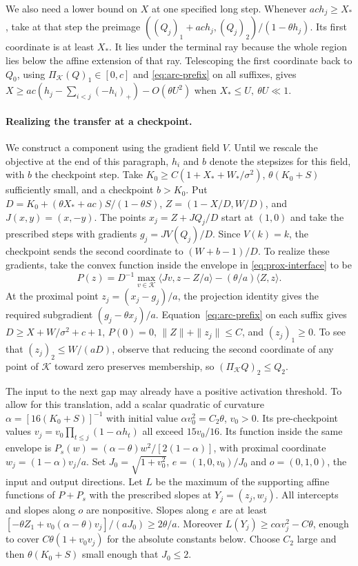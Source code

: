 \documentclass[11pt]{article}
\theoremstyle{definition}
\begin{document}
We also need a lower bound on \(X\) at one specified long step.
Whenever \(ac h_j\ge X_*\), take at that step the preimage
\(((Q_j)_1+ac h_j,(Q_j)_2)/(1-\theta h_j)\). Its first coordinate
is at least \(X_*\). It lies under the terminal ray because the whole
region lies below the affine extension of that ray. Telescoping the
first coordinate back to \(Q_0\), using \(\Pi_{\mathcal K}(Q)_1\in[0,c]\)
and \eqref{eq:arc-prefix} on all suffixes, gives
\(X\ge ac(h_j-\sum_{i<j}(-h_i)_+)-O(\theta U^2)\) when
\(X_*\le U,\ \theta U\ll1\).

\paragraph{Realizing the transfer at a checkpoint.}
We construct a component using the gradient field \(V\). Until we rescale
the objective at the end of this paragraph, \(h_i\) and \(b\) denote the
stepsizes for this field, with \(b\) the checkpoint step. Take
\(K_0\ge C(1+X_*+W_*/\sigma^2)\), \(\theta(K_0+S)\) sufficiently
small, and a checkpoint \(b>K_0\). Put
\(D=K_0+(\theta X_*+ac)S/(1-\theta S)\), \(Z=(1-X/D,W/D)\), and
\(J(x,y)=(x,-y)\). The points \(x_j=Z+JQ_j/D\) start at \((1,0)\)
and take the prescribed steps with gradients \(g_j=JV(Q_j)/D\).
Since \(V(k)=k\), the checkpoint sends the second coordinate to \((W+b-1)/D\).
To realize these gradients, take the convex function inside the envelope
in \eqref{eq:prox-interface} to be
\[
 P(z)=D^{-1}\max_{v\in\mathcal K}\langle Jv,z-Z/a\rangle
                    -(\theta/a)\langle Z,z\rangle .
\]
At the proximal point \(z_j=(x_j-g_j)/a\), the projection identity gives
the required subgradient \((g_j-\theta x_j)/a\). Equation~\eqref{eq:arc-prefix} on each suffix gives
\(D\ge X+W/\sigma^2+c+1\), \(P(0)=0\), \(\|Z\|+\|z_j\|\le C\),
and \((z_j)_1\ge0\). To see that \((z_j)_2\le W/(aD)\), observe that
reducing the second coordinate of any point of \(\mathcal K\) toward zero
preserves membership, so \((\Pi_{\mathcal K}Q)_2\le Q_2\).

The input to the next gap may already have a positive activation threshold. To allow for this translation, add a scalar quadratic of curvature
\(\alpha=[16(K_0+S)]^{-1}\) with initial value \(\alpha v_0^2=C_2\theta\),
\(v_0>0\). Its pre-checkpoint values \(v_j=v_0\prod_{t\le j}(1-\alpha h_t)\)
all exceed \(15v_0/16\). Its function inside the same envelope is
\(P_s(w)=(\alpha-\theta)w^2/[2(1-\alpha)]\), with proximal coordinate
\(w_j=(1-\alpha)v_j/a\). Set \(J_0=\sqrt{1+v_0^2}\),
\(e=(1,0,v_0)/J_0\) and \(o=(0,1,0)\), the input and output directions.
Let \(L\) be the maximum of the supporting affine functions of \(P+P_s\)
with the prescribed slopes at \(Y_j=(z_j,w_j)\).
All intercepts and slopes along \(o\) are nonpositive. Slopes along
\(e\) are at least \([-\theta Z_1+v_0(\alpha-\theta)v_j]/(aJ_0)
\ge2\theta/a\). Moreover \(L(Y_j)\ge c\alpha v_j^2-C\theta\),
enough to cover \(C\theta(1+v_0v_j)\) for the absolute constants
below. Choose \(C_2\) large and then \(\theta(K_0+S)\) small enough
that \(J_0\le2\).
\end{document}
